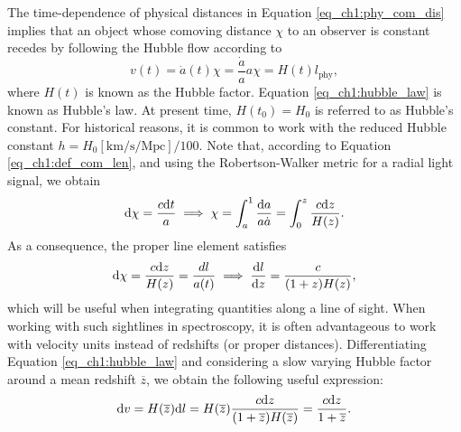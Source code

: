 The time-dependence of physical distances in Equation \ref{eq_ch1:phy_com_dis} implies that an object whose comoving distance $\chi$ to an observer is constant recedes by following the Hubble flow according to
\begin{equation}\label{eq_ch1:hubble_law}
    v(t)=\dot{a}(t)\chi=\frac{\dot{a}}{a}a\chi=H(t)l_\text{phy},
\end{equation}
where $H(t)$ is known as the Hubble factor. Equation \ref{eq_ch1:hubble_law} is known as Hubble's law. At present time, $H(t_0)=H_0$ is referred to as Hubble's constant. For historical reasons, it is common to work with the reduced Hubble constant $h=H_0 [\text{km/s/Mpc}]/100$.
Note that, according to Equation \ref{eq_ch1:def_com_len}, and using the Robertson-Walker metric for a radial light signal, we obtain
\begin{equation}
    \differential \chi=\frac{c\differential t}{a}\implies \chi=\int_a^1\frac{\differential a}{a \dot{a}}=\int_0^z\frac{c \differential z}{H(z)}.
\end{equation}
As a consequence, the proper line element satisfies
\begin{equation}\label{eq_ch1:dl_over_dz}
    \differential \chi =\frac{c\differential z}{H(z)}=\frac{dl}{a(t)} \implies \frac{\differential l}{\differential z}=\frac{c}{(1+z)H(z)},
\end{equation}
which will be useful when integrating quantities along a line of sight. When working with such sightlines in spectroscopy, it is often advantageous to work with velocity units instead of redshifts (or proper distances). Differentiating Equation \ref{eq_ch1:hubble_law} and considering a slow varying Hubble factor around a mean redshift $\overline{z}$, we obtain the following useful expression:
\begin{equation}
    \differential v=H(\overline{z})\differential l=H(\overline{z})\frac{c\differential z}{(1+\overline{z})H(\overline{z})}=\frac{c\differential z}{1+\overline{z}}.
\end{equation}

